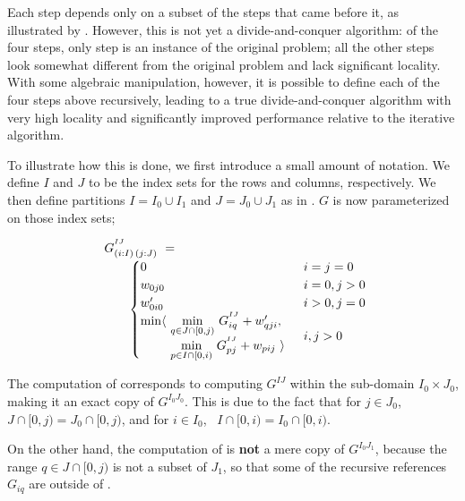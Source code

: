 Each step depends only on a subset of the steps that came before it, 
as illustrated by . However, this is not yet a divide-and-conquer algorithm: 
of the four steps, only step  is an instance of the original problem; all the other steps
look somewhat different from the original problem and lack significant locality. With some algebraic manipulation, however, 
it is possible to define each of the four steps above recursively, leading to a true divide-and-conquer algorithm with very high locality 
and significantly improved performance relative to the iterative algorithm.

To illustrate how this is done, we first introduce a small amount of notation. 
We define $I$ and $J$ to be the index sets for the rows and columns, respectively.
We then define partitions $I=I_0\cup I_1$ and $J=J_0\cup J_1$ as in .
$G$ is now parameterized on those index sets;

\begin{equation}
\begin{array}{l@{}l}
	G^{^{IJ}}_{(i:I)\,(j:J)} ~=~  \\
	\qquad
	\begin{cases}
		0                         & i=j=0 \\
		w_{0j0}                   & i=0, j>0 \\
		w'_{0i0}                  & i>0, j=0 \\
		\begin{array}{@{}l@{~}l}
		  \min\langle & \underset{q\in J\cap[0,j)}\min ~ G^{^{IJ}}_{iq} + \yw{qji}, \\
		              & \underset{p\in I\cap[0,i)}\min ~ G^{^{IJ}}_{pj} + \xw{pij}~\rangle
		\end{array}              & i,j>0
	\end{cases}
\end{array}
\end{equation}

The computation of  corresponds to computing $G^{IJ}$ within the sub-domain 
$I_0\times J_0$, making it an exact copy of $G^{I_0J_0}$. This is due to the fact
that for $j\in J_0$, ~$J\cap[0,j)=J_0\cap[0,j)$, and for $i\in I_0$, ~$I\cap[0,i)=I_0\cap[0,i)$.

On the other hand, the computation of  is {\bf not} a mere copy of $G^{I_0J_1}$, 
because the range $q\in J\cap[0,j)$ is not a subset of $J_1$, so that
some of the recursive references $G_{iq}$ are outside of .

